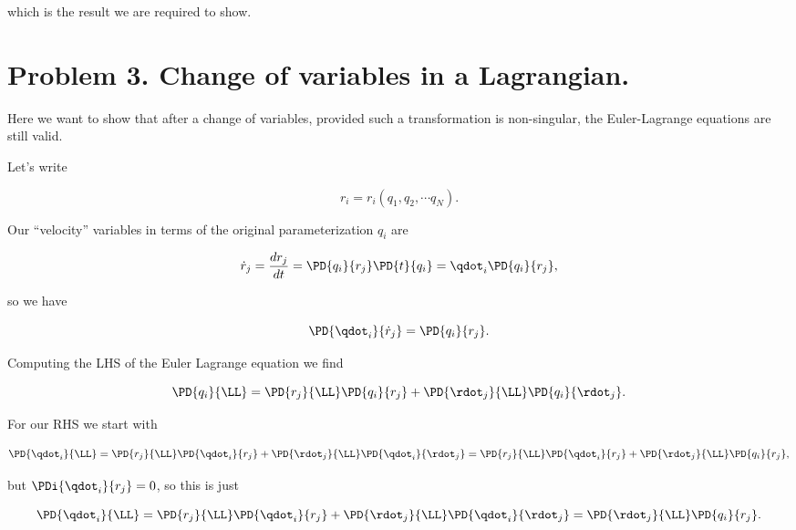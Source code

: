 which is the result we are required to show.

\section{Problem 3.  Change of variables in a Lagrangian.}

Here we want to show that after a change of variables, provided such a transformation is non-singular, the Euler-Lagrange equations are still valid.

Let's write

\begin{equation}\label{eqn:classicalMechanicsPs1:320}
r_i = r_i(q_1, q_2, \cdots q_N).
\end{equation}

Our ``velocity'' variables in terms of the original parameterization $q_i$ are

\begin{equation}\label{eqn:classicalMechanicsPs1:340}
\dot{r}_j = \frac{dr_j}{dt} = \PD{q_i}{r_j} \PD{t}{q_i} = \qdot_i \PD{q_i}{r_j},
\end{equation}

so we have

\begin{equation}\label{eqn:classicalMechanicsPs1:360}
\PD{\qdot_i}{\dot{r}_j} = \PD{q_i}{r_j}.
\end{equation}

Computing the LHS of the Euler Lagrange equation we find

\begin{equation}\label{eqn:classicalMechanicsPs1:380}
\PD{q_i}{\LL} = 
\PD{r_j}{\LL} \PD{q_i}{r_j}
+\PD{\rdot_j}{\LL} \PD{q_i}{\rdot_j}.
\end{equation}

For our RHS we start with

\begin{equation}\label{eqn:classicalMechanicsPs1:400}
\PD{\qdot_i}{\LL} 
= 
\PD{r_j}{\LL} \PD{\qdot_i}{r_j}
+\PD{\rdot_j}{\LL} \PD{\qdot_i}{\rdot_j}
= 
\PD{r_j}{\LL} \PD{\qdot_i}{r_j}
+\PD{\rdot_j}{\LL} \PD{q_i}{r_j},
\end{equation}

but $\PDi{\qdot_i}{r_j} = 0$, so this is just

\begin{equation}\label{eqn:classicalMechanicsPs1:420}
\PD{\qdot_i}{\LL} 
= 
\PD{r_j}{\LL} \PD{\qdot_i}{r_j}
+\PD{\rdot_j}{\LL} \PD{\qdot_i}{\rdot_j}
= 
\PD{\rdot_j}{\LL} \PD{q_i}{r_j}.
\end{equation}

